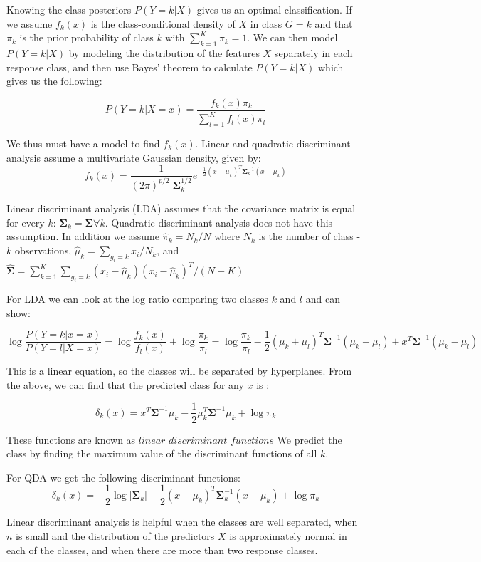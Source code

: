 \documentclass[12pt,twoside]{reedthesis}
\theoremstyle{definition}
\theoremstyle{definition}
\theoremstyle{definition}
\theoremstyle{remark}
\begin{document}
Knowing the class posteriors \(P(Y = k|X)\) gives us an optimal
classification. If we assume \(f_k(x)\) is the class-conditional density
of \(X\) in class \(G = k\) and that \(\pi_k\) is the prior probability
of class \(k\) with \(\sum_{k=1}^K \pi_k = 1\). We can then model
\(P(Y = k | X)\) by modeling the distribution of the features \(X\)
separately in each response class, and then use Bayes' theorem to
calculate \(P(Y = k |X)\) which gives us the following:

\[ P(Y = k | X = x) = \frac{f_k(x)\pi_k}{\sum_{l = 1}^Kf_l(x)\pi_l}\]

We thus must have a model to find \(f_k(x)\). Linear and quadratic
discriminant analysis assume a multivariate Gaussian density, given by:
\[f_k(x) = \frac{1}{(2\pi)^{p/2}|\mathbf{\Sigma}_k^{1/2}}e^{-\frac{1}{2}(x-\mu_k)^T\mathbf{\Sigma}_k^{-1}(x - \mu_k)}\]

Linear discriminant analysis (LDA) assumes that the covariance matrix is
equal for every \(k\):
\(\mathbf{\Sigma}_k = \mathbf{\Sigma} \forall k\). Quadratic
discriminant analysis does not have this assumption. In addition we
assume \(\hat{\pi}_k = N_k/N\) where \(N_k\) is the number of class -
\(k\) observations, \(\hat{\mu}_k = \sum_{g_i = k}x_i/N_k\), and
\(\mathbf{\hat{\Sigma}} = \sum_{k = 1}^{K}\sum_{g_i = k}(x_i - \hat \mu_k)(x_i - \hat\mu_k)^T / (N- K)\)

For LDA we can look at the log ratio comparing two classes \(k\) and
\(l\) and can show:

\[\log\frac{P(Y= k|x = x)}{P(Y = l|X = x)} = \log\frac{f_k(x)}{f_l(x)} + \log\frac{\pi_k}{\pi_l} = \log \frac{\pi_k}{\pi_l} - \frac{1}{2}(\mu_k + \mu_l)^T\mathbf{\Sigma}^{-1}(\mu_k- \mu_l) + x^T\mathbf{\Sigma}^{-1}(\mu_k - \mu_l) \]

This is a linear equation, so the classes will be separated by
hyperplanes. From the above, we can find that the predicted class for
any \(x\) is :

\[ \delta_k(x) = x^T\mathbf{\Sigma}^{-1}\mu_k - \frac{1}{2}\mu_k^T\mathbf{\Sigma}^{-1}\mu_k + \log \pi_k \]

These functions are known as \(\textit{linear discriminant functions}\)
We predict the class by finding the maximum value of the discriminant
functions of all \(k\).

For QDA we get the following discriminant functions:
\[ \delta_k(x) = -\frac{1}{2}\log|\mathbf{\Sigma}_k| - \frac{1}{2}(x - \mu_k)^T\mathbf{\Sigma}_k^{-1}(x - \mu_k) + \log \pi_k \]

Linear discriminant analysis is helpful when the classes are well
separated, when \(n\) is small and the distribution of the predictors
\(X\) is approximately normal in each of the classes, and when there are
more than two response classes.
\end{document}
